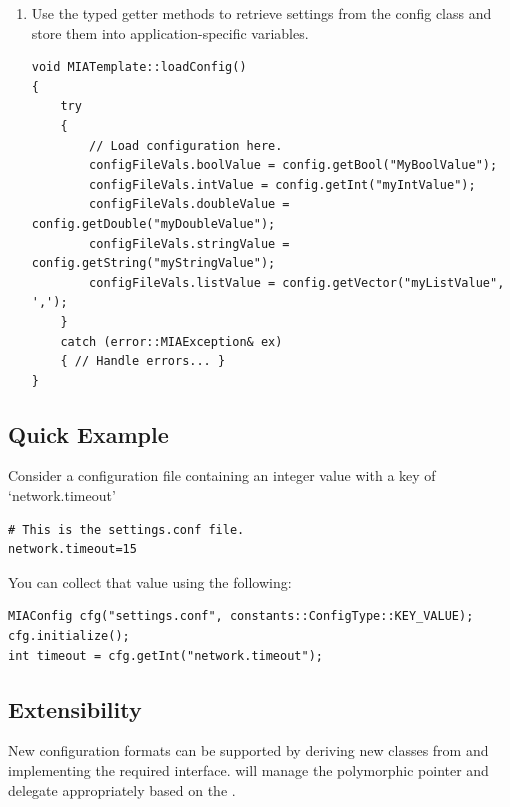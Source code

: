\begin{enumerate}
\begin{lstlisting}[style=cppstyle]
		// This will call config.initialize().
		config.setConfigFileName(configFile, constants::ConfigType::KEY_VALUE);
	}
	// Optionally print the config values after it is loaded.
	if (getVerboseMode())
		config.dumpConfigMap();

	loadConfig(); // An app-specific config loader.
}
	\end{lstlisting}
	\item Use the typed getter methods to retrieve settings from the config class and store them into application-specific variables.
	\begin{lstlisting}[style=cppstyle]
void MIATemplate::loadConfig()
{
	try
	{
		// Load configuration here.
		configFileVals.boolValue = config.getBool("MyBoolValue");
		configFileVals.intValue = config.getInt("myIntValue");
		configFileVals.doubleValue = config.getDouble("myDoubleValue");
		configFileVals.stringValue = config.getString("myStringValue");
		configFileVals.listValue = config.getVector("myListValue", ',');
	}
	catch (error::MIAException& ex)
	{ // Handle errors... }
}
	\end{lstlisting}
\end{enumerate}

\subsection{Quick Example}

Consider a configuration file containing an integer value with a key of `network.timeout'
\begin{lstlisting}[style=cppstyle]
# This is the settings.conf file.
network.timeout=15
\end{lstlisting}
You can collect that value using the following: 
\begin{lstlisting}[style=cppstyle]
MIAConfig cfg("settings.conf", constants::ConfigType::KEY_VALUE);
cfg.initialize();
int timeout = cfg.getInt("network.timeout");
\end{lstlisting}

\subsection{Extensibility}

New configuration formats can be supported by deriving new classes from  and implementing the required interface.  will manage the polymorphic pointer and delegate appropriately based on the .
























